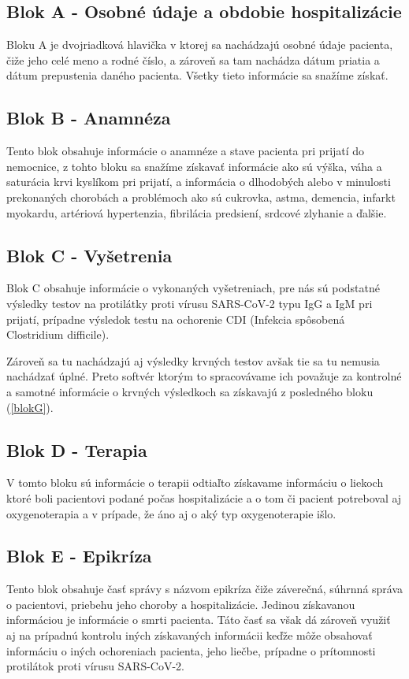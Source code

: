\subsection{Blok A - Osobné údaje a obdobie hospitalizácie}
\label{blokA}
Bloku A je dvojriadková hlavička v ktorej sa nachádzajú osobné údaje pacienta, čiže jeho celé meno a rodné číslo, a zároveň sa tam nachádza dátum priatia a dátum prepustenia daného pacienta. Všetky tieto informácie sa snažíme získať.

\subsection{Blok B - Anamnéza}
\label{blokB}
Tento blok obsahuje informácie o anamnéze a stave pacienta pri prijatí do nemocnice, z tohto bloku sa snažíme získavať informácie ako sú výška, váha a saturácia krvi kyslíkom pri prijatí, a informácia o dlhodobých alebo v minulosti prekonaných chorobách a problémoch ako sú cukrovka, astma, demencia, infarkt myokardu, artériová hypertenzia, fibrilácia predsiení, srdcové zlyhanie a ďalšie.

\subsection{Blok C - Vyšetrenia}
\label{blokC}
Blok C obsahuje informácie o vykonaných vyšetreniach, pre nás sú podstatné výsledky testov na protilátky proti vírusu SARS-CoV-2 typu IgG a IgM pri prijatí, prípadne výsledok testu na ochorenie CDI (Infekcia spôsobená Clostridium difficile).

Zároveň sa tu nachádzajú aj výsledky krvných testov avšak tie sa tu nemusia nachádzať úplné. Preto softvér ktorým to spracovávame ich považuje za kontrolné a samotné informácie o krvných výsledkoch sa získavajú z posledného bloku (\ref{blokG}).

\subsection{Blok D - Terapia}
\label{blokD}
V tomto bloku sú informácie o terapii odtiaľto získavame informáciu o liekoch ktoré boli pacientovi podané počas hospitalizácie a o tom či pacient potreboval aj oxygenoterapia a v prípade, že áno aj o aký typ oxygenoterapie išlo.

\subsection{Blok E - Epikríza}
\label{blokE}
Tento blok obsahuje časť správy s názvom epikríza čiže záverečná, súhrnná správa o pacientovi, priebehu jeho choroby a hospitalizácie. Jedinou získavanou informáciou je informácie o smrti pacienta. Táto časť sa však dá zároveň využiť aj na prípadnú kontrolu iných získavaných informácii keďže môže obsahovať informáciu o iných ochoreniach pacienta, jeho liečbe, prípadne o prítomnosti protilátok proti vírusu SARS-CoV-2.

